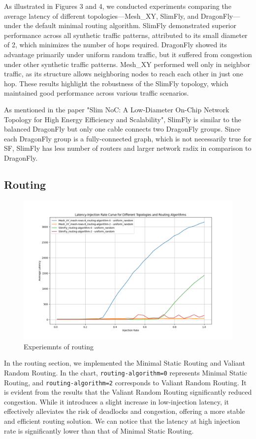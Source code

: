 \documentclass[utf8]{article}
\begin{document}
As illustrated in Figures 3 and 4, we conducted experiments comparing the average latency of different topologies—Mesh\_XY, SlimFly, and DragonFly—under the default minimal routing algorithm. SlimFly demonstrated superior performance across all synthetic traffic patterns, attributed to its small diameter of 2, which minimizes the number of hops required. DragonFly showed its advantage primarily under uniform random traffic, but it suffered from congestion under other synthetic traffic patterns. Mesh\_XY performed well only in neighbor traffic, as its structure allows neighboring nodes to reach each other in just one hop. These results highlight the robustness of the SlimFly topology, which maintained good performance across various traffic scenarios.

As mentioned in the paper "Slim NoC: A Low-Diameter On-Chip Network Topology for High Energy Efficiency and Scalability", SlimFly is similar to the balanced DragonFly but only one cable connects two DragonFly groups. Since each DragonFly group is a fully-connected graph, which is not necessarily true for SF, SlimFly has less number of routers and larger network radix in comparison to DragonFly.
\subsection{Routing}

\begin{figure}[H]
    \centering
    \includegraphics[width=0.85\linewidth]{routing.png}
    \caption{Experiemnts of routing}
\end{figure}

In the routing section, we implemented the Minimal Static Routing and Valiant Random Routing. In the chart, \texttt{routing-algorithm=0} represents Minimal Static Routing, and \texttt{routing-algorithm=2} corresponds to Valiant Random Routing. It is evident from the results that the Valiant Random Routing significantly reduced congestion. While it introduces a slight increase in low-injection latency, it effectively alleviates the risk of deadlocks and congestion, offering a more stable and efficient routing solution. We can notice that the latency at high injection rate is significantly lower than that of Minimal Static Routing.
\end{document}
